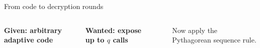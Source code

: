 \begin{frame}[fragile]{From code to decryption rounds}
  \begin{columns}[T,onlytextwidth]
      {\small\textbf{Given: arbitrary adaptive code}}\par
      \smallskip
      
      \vspace{1.6cm}
      \centering
      {\small\textbf{Wanted: expose up to $q$ calls}}\par
      \smallskip
      \begin{center}
      \end{center}
      \smallskip
      {\small Now apply the Pythagorean sequence rule.}\par
  \end{columns}
\end{frame}
